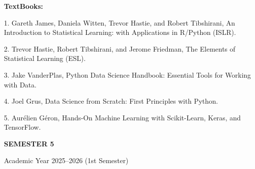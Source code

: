 \documentclass[12pt,a4paper]{article}
\begin{document}
\textbf{TextBooks:}\par\vspace{2pt}
1. Gareth James, Daniela Witten, Trevor Hastie, and Robert Tibshirani, An Introduction to Statistical Learning: with Applications in R/Python (ISLR).\par
2. Trevor Hastie, Robert Tibshirani, and Jerome Friedman, The Elements of Statistical Learning (ESL).\par
3. Jake VanderPlas, Python Data Science Handbook: Essential Tools for Working with Data.\par
4. Joel Grus, Data Science from Scratch: First Principles with Python.\par
5. Aurélien Géron, Hands-On Machine Learning with Scikit-Learn, Keras, and TensorFlow.\par
\vspace{4pt}

\newpage
\vspace*{\fill}
\begin{center}
  {\fontsize{28pt}{34pt}\selectfont \textbf{SEMESTER 5}}\par\vspace{12pt}
  {\fontsize{13pt}{17pt}\selectfont Academic Year 2025–2026 (1st Semester)}
\end{center}
\vspace*{\fill}
\end{document}
